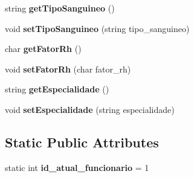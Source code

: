 \begin{DoxyCompactItemize}
string {\bfseries get\+Tipo\+Sanguineo} ()
\item 
\mbox{\label{classFuncionario_a979101220d0113b4fc018e1c938d86a2}} 
void {\bfseries set\+Tipo\+Sanguineo} (string tipo\+\_\+sanguineo)
\item 
\mbox{\label{classFuncionario_a87dc4304683c4a4492a5ecd516d29f44}} 
char {\bfseries get\+Fator\+Rh} ()
\item 
\mbox{\label{classFuncionario_a37190bf1412027f171086f95fa410c2f}} 
void {\bfseries set\+Fator\+Rh} (char fator\+\_\+rh)
\item 
\mbox{\label{classFuncionario_a1a814a8a11d9750dbfedcf8cdf87fd45}} 
string {\bfseries get\+Especialidade} ()
\item 
\mbox{\label{classFuncionario_a799ba2c679c393ca1ee07bb917213f3a}} 
void {\bfseries set\+Especialidade} (string especialidade)
\end{DoxyCompactItemize}
\subsection*{Static Public Attributes}
\begin{DoxyCompactItemize}
\item 
\mbox{\label{classFuncionario_a88223afcfdbe71d3cc0beb48d32b1439}} 
static int {\bfseries id\+\_\+atual\+\_\+funcionario} = 1
\end{DoxyCompactItemize}
